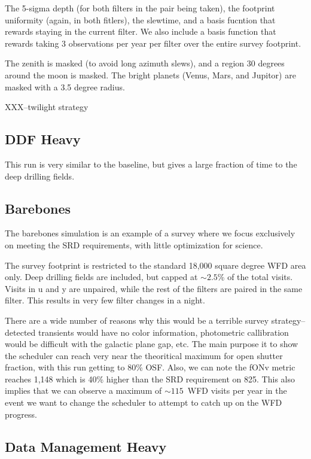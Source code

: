 The 5-sigma depth (for both filters in the pair being taken), the footprint uniformity (again, in both fitlers), the slewtime, and a basis fucntion that rewards staying in the current filter.  We also include a basis function that rewards taking 3 observations per year per filter over the entire survey footprint.  

The zenith is masked (to avoid long azimuth slews), and a region 30 degrees around the moon is masked. The bright planets (Venus, Mars, and Jupitor) are masked with a 3.5 degree radius. 

XXX--twilight strategy


\subsection{DDF Heavy}

This run is very similar to the baseline, but gives a large fraction of time to the deep drilling fields.



\subsection{Barebones}

The barebones simulation is an example of a survey where we focus exclusively on meeting the SRD requirements, with little optimization for science.

The survey footprint is restricted to the standard 18,000 square degree WFD area only. Deep drilling fields are included, but capped at $\sim2.5$\% of the total visits. Visits in u and y are unpaired, while the rest of the filters are paired in the same filter. This results in very few filter changes in a night. 

There are a wide number of reasons why this would be a terrible survey strategy--detected transients would have no color information, photometric callibration would be difficult with the galactic plane gap, etc.  The main purpose it to show the scheduler can reach very near the theoritical maximum for open shutter fraction, with this run getting to 80\% OSF. Also, we can note the fONv metric reaches 1,148 which is 40\% higher than the SRD requirement on 825. This also implies that we can observe a maximum of $\sim115$\ WFD visits per year in the event we want to change the scheduler to attempt to catch up on the WFD progress. 



\subsection{Data Management Heavy}

